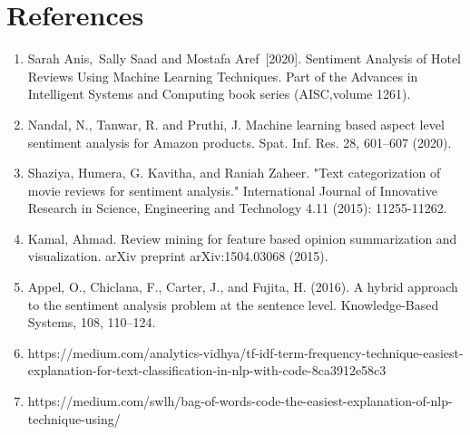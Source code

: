 \section{References}
\begin{enumerate}



\item Sarah Anis, Sally Saad and Mostafa Aref [2020].
Sentiment Analysis of Hotel Reviews Using Machine Learning Techniques. Part of the Advances in Intelligent Systems and Computing book series (AISC,volume 1261).
\item Nandal, N., Tanwar, R. and Pruthi, J. Machine learning based aspect level sentiment analysis for Amazon products. Spat. Inf. Res. 28, 601–607 (2020).
\item Shaziya, Humera, G. Kavitha, and Raniah Zaheer. "Text categorization of movie reviews for sentiment analysis." International Journal of Innovative Research in Science, Engineering and Technology 4.11 (2015): 11255-11262.


\item Kamal, Ahmad. Review mining for feature based opinion summarization and visualization. arXiv preprint arXiv:1504.03068 (2015).


\item Appel, O., Chiclana, F., Carter, J., and Fujita, H. (2016). A hybrid approach to the sentiment analysis problem at the sentence level. Knowledge-Based Systems, 108, 110–124.
\item https://medium.com/analytics-vidhya/tf-idf-term-frequency-technique-easiest-explanation-for-text-classification-in-nlp-with-code-8ca3912e58c3
\item https://medium.com/swlh/bag-of-words-code-the-easiest-explanation-of-nlp-technique-using/
\end{enumerate}



